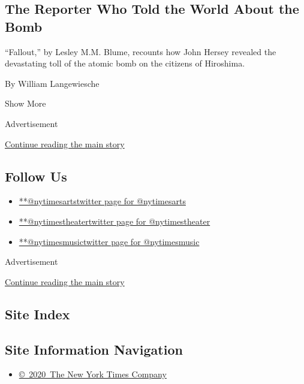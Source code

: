 \begin{enumerate}
  \hypertarget{the-reporter-who-told-the-world-about-the-bomb}{%
  \subsection{The Reporter Who Told the World About the
  Bomb}\label{the-reporter-who-told-the-world-about-the-bomb}}

  ``Fallout,'' by Lesley M.M. Blume, recounts how John Hersey revealed
  the devastating toll of the atomic bomb on the citizens of Hiroshima.

  By William Langewiesche
\end{enumerate}

Show More

Advertisement

\protect\hyperlink{after-mid2}{Continue reading the main story}

\hypertarget{follow-us}{%
\subsection{Follow Us}\label{follow-us}}

\begin{itemize}
\tightlist
\item
  \href{https://twitter.com/nytimesarts}{**@nytimesartstwitter page for
  @nytimesarts}
\item
  \href{https://twitter.com/nytimestheater}{**@nytimestheatertwitter
  page for @nytimestheater}
\item
  \href{https://twitter.com/nytimesmusic}{**@nytimesmusictwitter page
  for @nytimesmusic}
\end{itemize}

Advertisement

\protect\hyperlink{after-mktg}{Continue reading the main story}

\hypertarget{site-index}{%
\subsection{Site Index}\label{site-index}}

\hypertarget{site-information-navigation}{%
\subsection{Site Information
Navigation}\label{site-information-navigation}}

\begin{itemize}
\tightlist
\item
  \href{https://help.nytimes3xbfgragh.onion/hc/en-us/articles/115014792127-Copyright-notice}{©~2020~The
  New York Times Company}
\end{itemize}

